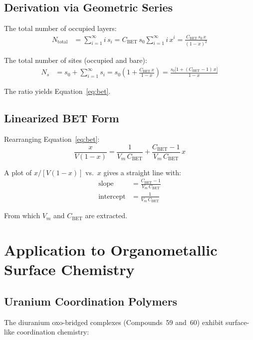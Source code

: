 \documentclass[11pt]{article}
\begin{document}
\subsection{Derivation via Geometric Series}

The total number of occupied layers:
\begin{align}
  N_{\text{total}} &= \sum_{i=1}^{\infty} i\, s_i
    = C_{\text{BET}}\, s_0 \sum_{i=1}^{\infty} i\, x^i
    = \frac{C_{\text{BET}}\, s_0\, x}{(1-x)^2}
\end{align}

The total number of sites (occupied and bare):
\begin{align}
  N_s &= s_0 + \sum_{i=1}^{\infty} s_i
       = s_0\left(1 + \frac{C_{\text{BET}}\, x}{1-x}\right)
       = \frac{s_0\bigl[1 + (C_{\text{BET}}-1)\, x\bigr]}{1-x}
\end{align}

The ratio yields Equation~\eqref{eq:bet}.

\subsection{Linearized BET Form}

Rearranging Equation~\eqref{eq:bet}:
\begin{equation}
  \frac{x}{V(1-x)} = \frac{1}{V_m\, C_{\text{BET}}}
    + \frac{C_{\text{BET}} - 1}{V_m\, C_{\text{BET}}}\, x
\end{equation}

A plot of $x / [V(1-x)]$ vs.\ $x$ gives a straight line with:
\begin{align}
  \text{slope} &= \frac{C_{\text{BET}} - 1}{V_m\, C_{\text{BET}}} \\
  \text{intercept} &= \frac{1}{V_m\, C_{\text{BET}}}
\end{align}

From which $V_m$ and $C_{\text{BET}}$ are extracted.

\section{Application to Organometallic Surface Chemistry}

\subsection{Uranium Coordination Polymers}

The diuranium oxo-bridged complexes (Compounds~59 and~60) exhibit
surface-like coordination chemistry:
\end{document}
